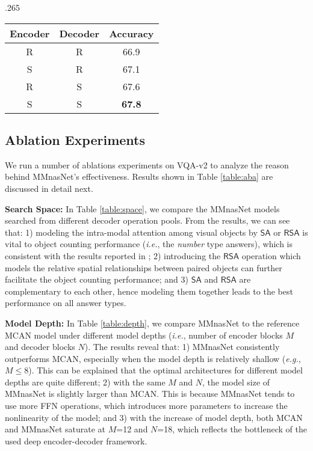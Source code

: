 \documentclass[sigconf]{acmart}
\begin{document}
\begin{table*}
\begin{subtable}[t]{.265\textwidth}
\begin{tabular}{cc|c}
            \toprule
            Encoder & Decoder & Accuracy \\
             \midrule
            R & R & 66.9 \\
            S & R &  67.1\\
            R & S & 67.6 \\
            S & S & \textbf{67.8} \\
            \bottomrule
        \end{tabular}
        \vspace{5pt}
        \label{table:random}
	\end{subtable}
	\caption{Ablation experiments for MMnasNet on VQA-v2. We train on the \emph{train} split and report the results on the \emph{val} split.}
     \vspace{-5pt}
    \label{table:aba}
\end{table*}

\subsection{Ablation Experiments}
We run a number of ablations experiments on VQA-v2 to analyze the reason behind MMnasNet's effectiveness. Results shown in Table \ref{table:aba} are discussed in detail next.

\noindent\textbf{Search Space:} In Table \ref{table:space}, we compare the MMnasNet models searched from different decoder operation pools. From the results, we can see that: 1) modeling the intra-modal attention among visual objects by $\textsf{SA}$ or $\textsf{RSA}$ is vital to object counting performance (\emph{i.e.}, the \emph{number} type answers), which is consistent with the results reported in \cite{yu2019mcan}; 2) introducing the $\textsf{RSA}$ operation which models the relative spatial relationships between paired objects can further facilitate the object counting performance; and 3) $\textsf{SA}$ and $\textsf{RSA}$ are complementary to each other, hence modeling them together leads to the best performance on all answer types.

\noindent\textbf{Model Depth:} In Table \ref{table:depth}, we compare MMnasNet to the reference MCAN model \cite{yu2019mcan} under different model depths (\emph{i.e.}, number of encoder blocks $M$ and decoder blocks $N$). The results reveal that: 1) MMnasNet consistently outperforms MCAN, especially when the model depth is relatively shallow (\emph{e.g.}, $M\leq8$). This can be explained that the optimal architectures for different model depths are quite different; 2) with the same $M$ and $N$, the model size of MMnasNet is slightly larger than MCAN. This is because MMnasNet tends to use more \textsf{FFN} operations, which introduces more parameters to increase the nonlinearity of the model; and 3) with the increase of model depth, both MCAN and MMnasNet saturate at $M$=12 and $N$=18, which reflects the bottleneck of the used deep encoder-decoder framework.
\end{document}
